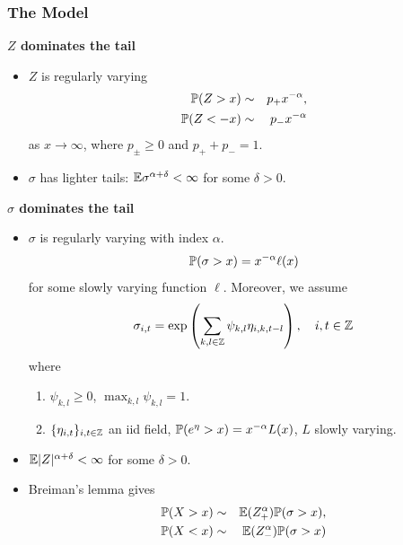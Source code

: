 \documentclass{beamer}
\begin{document}
\begin{frame}
  \frametitle{The Model}
  \begin{scriptsize}
    \begin{minipage}[t]{0.5\linewidth}
      \textcolor[HTML]{990033}{\bf $Z$ dominates the tail}      
      \begin{itemize}
      \item $Z$ is regularly varying
        \begin{eqnarray*}
        \P(Z > x) &\sim& p_+ x^{-\alpha}, \\
        \P(Z < -x) &\sim& p_- x^{-\alpha}
        \end{eqnarray*}
        as $x \to \infty$, where $p_\pm \geq 0$ and $p_+ + p_- = 1$.
      \item $\sigma$ has lighter tails:
        $\E \sigma^{\alpha + \delta} < \infty$ for some $\delta > 0$.
      \end{itemize}
    \end{minipage}\hfill
    \begin{minipage}[t]{0.5\linewidth}
      \textcolor[HTML]{990033}{\bf $\sigma$ dominates the tail}      
      \begin{itemize}
      \item $\sigma$ is regularly varying with index $\alpha$.
        \[
        \P(\sigma > x) = x^{-\alpha} \ell(x)
        \]
        for some slowly varying function $\ell$. Moreover, we assume
        \[
        \sigma_{i, t} = \exp \left(
          \sum_{k,l \in \integers}
          \psi_{k,l} \eta_{i,k, t-l}
        \right),
        \quad
        i, t \in \integers
        \]
        where
          \begin{enumerate}
          \item {\scriptsize $\psi_{k,l} \geq 0$, $\max_{k,l} \psi_{k,l} = 1$}.
          \item {\scriptsize $\{\eta_{i,t}\}_{i, t \in \integers}$ an iid field,
            $\P(e^\eta > x) = x^{-\alpha} L(x)$, $L$ slowly varying.}
          \end{enumerate}
      \item $\E |Z|^{\alpha + \delta} < \infty$ for some $\delta > 0$.
      \item Breiman's lemma gives
        \begin{eqnarray*}
        \P(X > x) &\sim& \E(Z_+^\alpha) \P(\sigma > x), \\
        \P(X < x) &\sim& \E(Z_-^\alpha) \P(\sigma > x)
        \end{eqnarray*}
      \end{itemize}
    \end{minipage}
\end{scriptsize}
\end{frame}
\end{document}
